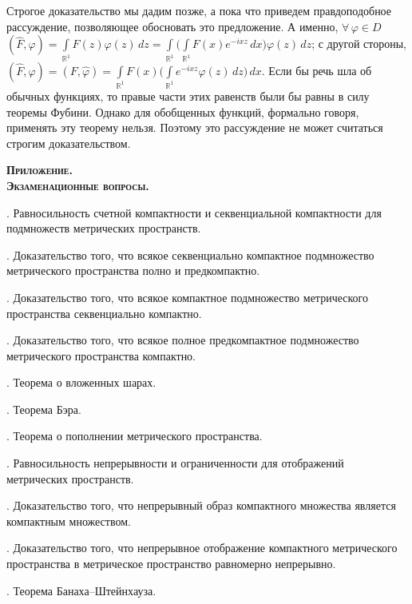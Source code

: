 \documentclass[10pt,titlepage, a4paper]{article}
\begin{document}
Строгое доказательство мы дадим позже, а пока что приведем
правдоподобное рассуждение, позволяющее обосновать это предложение.
А именно, $\forall\,\varphi\in
D$\;\;$(\hat{F},\varphi)=\int\limits_{\mathbb{R}^1}\!\hat{F}(z)\varphi(z)\,dz=
\int\limits_{\mathbb{R}^1}\!\Big(\int\limits_{\mathbb{R}^1}\!F(x)e^{-ixz}\,dx\Big)\varphi(z)\,dz$;
с другой стороны,
$(\hat{F},\varphi)=(F,\hat{\varphi})=\int\limits_{\mathbb{R}^1}\!F(x)\Big(\int\limits_{\mathbb{R}^1}\!
e^{-ixz}\varphi(z)\,dz\Big)\,dx$. Если бы речь шла об обычных
функциях, то правые части этих равенств были бы равны в силу теоремы
Фубини. Однако для обобщенных функций, формально говоря, применять
эту теорему нельзя. Поэтому это рассуждение не может считаться
строгим доказательством.

\clearpage

\begin{center}
\textbf{\textsc{Приложение. \\ Экзаменационные вопросы.}}
\end{center}

\vspace{7pt}

. Равносильность счетной компактности и секвенциальной
компактности для подмножеств метрических пространств.

. Доказательство того, что всякое секвенциально
компактное подмножество  метрического пространства полно и
предкомпактно.

. Доказательство того, что всякое компактное подмножество
метрического пространства секвенциально компактно.

. Доказательство того, что всякое полное предкомпактное
подмножество метрического пространства компактно.

. Теорема о вложенных шарах.

. Теорема Бэра.

. Теорема о пополнении метрического пространства.

. Равносильность непрерывности и ограниченности для
отображений метрических пространств.

. Доказательство того, что непрерывный образ компактного
множества является компактным множеством.

. Доказательство того, что непрерывное отображение
компактного ме\-трического пространства в метрическое пространство
равномерно непрерывно.

. Теорема Банаха--Штейнхауза.
\end{document}
